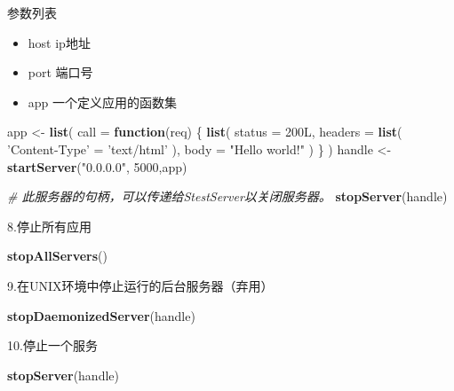 \documentclass[]{book}
\newenvironment{Shaded}{\begin{snugshade}}{\end{snugshade}}
\newcommand{\KeywordTok}[1]{\textcolor[rgb]{0.13,0.29,0.53}{\textbf{#1}}}
\newcommand{\DataTypeTok}[1]{\textcolor[rgb]{0.13,0.29,0.53}{#1}}
\newcommand{\DecValTok}[1]{\textcolor[rgb]{0.00,0.00,0.81}{#1}}
\newcommand{\StringTok}[1]{\textcolor[rgb]{0.31,0.60,0.02}{#1}}
\newcommand{\CommentTok}[1]{\textcolor[rgb]{0.56,0.35,0.01}{\textit{#1}}}
\newcommand{\ControlFlowTok}[1]{\textcolor[rgb]{0.13,0.29,0.53}{\textbf{#1}}}
\newcommand{\NormalTok}[1]{#1}
\theoremstyle{definition}
\theoremstyle{definition}
\theoremstyle{definition}
\theoremstyle{remark}
\begin{document}
参数列表

\begin{itemize}
\item
  host ip地址
\item
  port 端口号
\item
  app 一个定义应用的函数集
\end{itemize}

\begin{Shaded}
\begin{Highlighting}[]

\NormalTok{app <-}\StringTok{ }\KeywordTok{list}\NormalTok{(}
  \DataTypeTok{call =} \ControlFlowTok{function}\NormalTok{(req) \{}
    \KeywordTok{list}\NormalTok{(}
      \DataTypeTok{status =}\NormalTok{ 200L,}
      \DataTypeTok{headers =} \KeywordTok{list}\NormalTok{(}
        \StringTok{'Content-Type'}\NormalTok{ =}\StringTok{ 'text/html'}
\NormalTok{        ),}
      \DataTypeTok{body =} \StringTok{"Hello world!"}
\NormalTok{    )}
\NormalTok{    \}}
\NormalTok{  )}
\NormalTok{handle <-}\StringTok{ }\KeywordTok{startServer}\NormalTok{(}\StringTok{"0.0.0.0"}\NormalTok{, }\DecValTok{5000}\NormalTok{,app)}

\CommentTok{# 此服务器的句柄，可以传递给StestServer以关闭服务器。}
\KeywordTok{stopServer}\NormalTok{(handle)}
\end{Highlighting}
\end{Shaded}

8.停止所有应用

\begin{Shaded}
\begin{Highlighting}[]
\KeywordTok{stopAllServers}\NormalTok{()}
\end{Highlighting}
\end{Shaded}

9.在UNIX环境中停止运行的后台服务器（弃用）

\begin{Shaded}
\begin{Highlighting}[]
\KeywordTok{stopDaemonizedServer}\NormalTok{(handle)}
\end{Highlighting}
\end{Shaded}

10.停止一个服务

\begin{Shaded}
\begin{Highlighting}[]
\KeywordTok{stopServer}\NormalTok{(handle)}
\end{Highlighting}
\end{Shaded}
\end{document}
